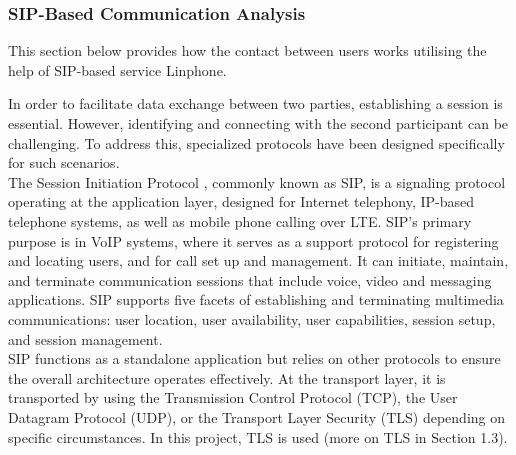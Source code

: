 \subsubsection{SIP-Based Communication Analysis}
\noindent This section below provides how the contact between users works utilising the help of SIP-based service Linphone.

    In order to facilitate data exchange between two parties, 
    establishing a session is essential. However, identifying and connecting with 
    the second participant can be challenging. To address this, specialized protocols 
    have been designed specifically for such scenarios. \\

    \noindent The Session Initiation Protocol \cite{sip}, 
    commonly known as SIP, is a signaling protocol operating at the 
    application layer, designed for Internet telephony, IP-based telephone systems, 
    as well as mobile phone calling over LTE. SIP’s primary purpose is in VoIP systems, where it serves 
    as a support protocol for registering and locating users, and for call set up and management. It can initiate, maintain, 
    and terminate communication sessions that include voice, video and messaging applications. SIP supports five facets of establishing and terminating multimedia communications: 
    user location, user availability, user capabilities, session setup, and session management. \\

    \noindent SIP functions as a standalone application but relies on other protocols 
    to ensure the overall architecture operates effectively. At the transport layer, 
    it is transported by using the Transmission Control Protocol (TCP), the User Datagram Protocol (UDP), 
    or the Transport Layer Security (TLS) depending on specific circumstances. In this project, 
    TLS is used (more on TLS in Section 1.3). \\

